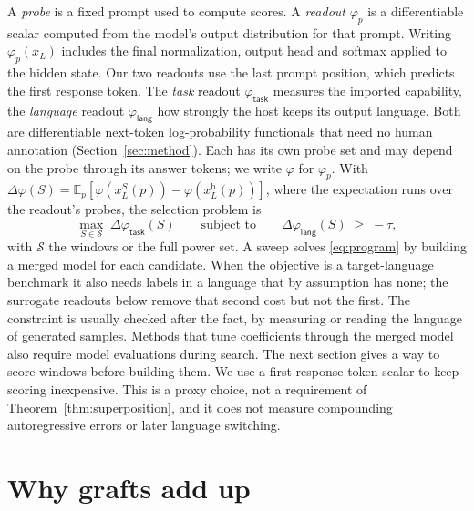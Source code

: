 \documentclass{article}
\theoremstyle{plain}
\theoremstyle{definition}
\theoremstyle{remark}
\newcommand{\host}{\mathrm{h}}
\newcommand{\util}{\mathsf{task}}
\newcommand{\risk}{\mathsf{lang}}
\newcommand{\Ex}{\mathbb{E}}
\begin{document}
A \emph{probe} is a fixed prompt used to compute scores. A \emph{readout}
$\varphi_p$ is a differentiable scalar computed from the model's output
distribution for that prompt. Writing $\varphi_p(x_L)$ includes the final
normalization, output head and softmax applied to the hidden state. Our two
readouts use the last prompt position, which predicts the first response token.
The \emph{task} readout $\varphi_\util$ measures the imported
capability, the \emph{language} readout $\varphi_\risk$ how strongly the host
keeps its output language. Both are differentiable next-token log-probability
functionals that need no human annotation (Section~\ref{sec:method}). Each has
its own probe set and may depend on the probe through its answer tokens; we write
$\varphi$ for $\varphi_p$. With
$\Delta\varphi(S) = \Ex_p[\varphi(x_L^{S}(p)) - \varphi(x_L^{\host}(p))]$, where the expectation runs over the readout's probes, the
selection problem is
\begin{equation}
\label{eq:program}
\max_{S\in\mathcal{S}} \;\Delta\varphi_\util(S)
\qquad \text{subject to} \qquad
\Delta\varphi_\risk(S) \;\ge\; -\tau ,
\end{equation}
with $\mathcal{S}$ the windows or the full power set. A sweep solves
\eqref{eq:program} by building a merged model for each candidate. When the
objective is a target-language benchmark it also needs labels in a language
that by assumption has none; the surrogate readouts below remove that second
cost but not the first. The constraint is usually checked after the fact, by
measuring or reading the language of generated samples. Methods that tune
coefficients through the merged model \citep{yang2024adamerging, symerge2026}
also require model evaluations during search. The next section gives a way to
score windows before building them.
We use a first-response-token scalar to keep scoring inexpensive. This is a
proxy choice, not a requirement of Theorem~\ref{thm:superposition}, and it does
not measure compounding autoregressive errors or later language switching.

\section{Why grafts add up}
\label{sec:theory}
\end{document}
